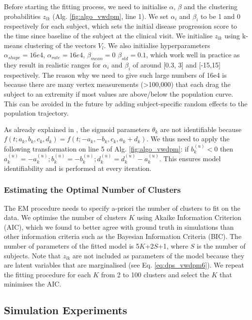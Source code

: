 Before starting the fitting process, we need to initialise $\alpha$, $\beta$ and the clustering probabilities $z_{lk}$ (Alg. \ref{fig:algo_vwdpm}, line 1). We set $\alpha_i$ and $\beta_i$ to be 1 and 0 respectively for each subject, which sets the initial disease progression score to the time since baseline of the subject at the clinical visit. We initialise $z_{lk}$ using k-means clustering of the vectors $V_l$. We also initialise hyperparameters $\alpha_{shape}=16e4$, $\alpha_{rate}=16e4$, $\beta_{mean} = 0$ $\beta_{std} = 0.1$, which work well in practice as they result in realistic ranges for $\alpha_i$ and $\beta_i$ of around [0.3, 3] and [-15,15] respectively. The reason why we need to give such large numbers of 16e4 is because there are many vertex measurements (>100,000) that each drag the subject to an extremity if most values are above/below the population curve. This can be avoided in the future by adding subject-specific random effects to the population trajectory.

As already explained in \cite{jedynak2012computational}, the sigmoid parameters $\theta_k$ are not identifiable because $f(t;a_k,b_k, c_k, d_k) = f(t;-a_k,-b_k, c_k, a_k + d_k)$. We thus need to apply the following transformation on line 5 of Alg. \ref{fig:algo_vwdpm}: if $b_k^{(u)} < 0$ then $a_k^{(u)} = - a_k^{(u)}; b_k^{(u)} = - b_k^{(u)}; d_k^{(u)} = d_k^{(u)} - a_k^{(u)}$. This ensures model identifiability and is performed at every iteration. 

\subsubsection{Estimating the Optimal Number of Clusters}

The EM procedure needs to specify a-priori the number of clusters to fit on the data. We optimise the number of clusters $K$ using Akaike Information Criterion (AIC), which we found to better agree with ground truth in simulations than other information criteria such as the Bayesian Information Criteria (BIC). The number of parameters of the fitted model is 5$K$+2$S$+1, where $S$ is the number of subjects. Note that $z_{lk}$ are not included as parameters of the model because they are latent variables that are marginalised (see Eq. \ref{eq:dps_vwdpm6}). We repeat the fitting procedure for each $K$ from 2 to 100 clusters and select the $K$ that minimises the AIC.


\subsection{Simulation Experiments}
\label{sec:diveSimulations}


